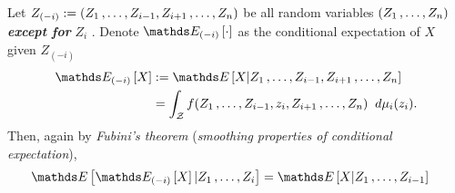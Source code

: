 \documentclass[11pt]{article}
\begin{document}
\begin{itemize}
\begin{remark}
Let $Z_{(-i)} := (Z_1 \,{,}\ldots{,}\, Z_{i-1}, Z_{i+1} \,{,}\ldots{,}\, Z_n)$ be all random variables $(Z_1 \,{,}\ldots{,}\, Z_n)$ \emph{\textbf{except for}} $Z_i$ . Denote $\E{(-i)}{\cdot}$ as the conditional expectation of $X$ given $Z_{(-i)}$
\begin{align*}
 \E{(-i)}{X} &:= \E{}{X | Z_1 \xdotx{,} Z_{i-1}, Z_{i+1} \xdotx{,} Z_n} \\
 &= \int_{\cZ} f(Z_1 \xdotx{,} Z_{i-1}, z_{i}, Z_{i+1} \xdotx{,} Z_n) \;\;d\mu_{i}(z_{i}).
\end{align*} Then, again by \emph{Fubini's theorem} (\emph{smoothing properties of conditional expectation}),
\begin{align}
\E{}{ \E{(-i)}{X} | Z_1 \xdotx{,} Z_i} &= \E{}{X | Z_1 \xdotx{,} Z_{i-1}} \label{eqn: martingale_smoothing_expectation}
\end{align} 
\end{remark}


\end{itemize}
\end{document}
